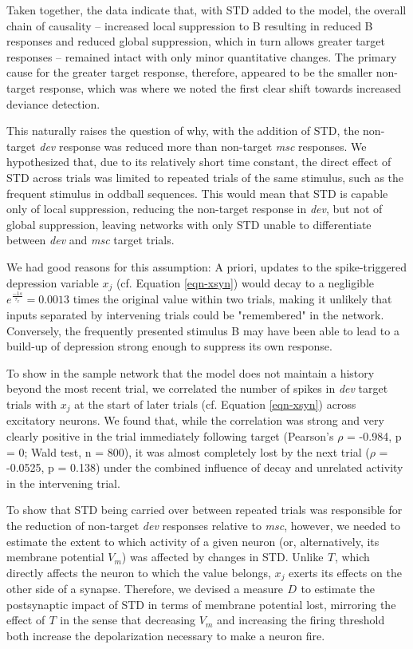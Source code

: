 \documentclass[pdflatex,referee,iicol,sn-basic]{sn-jnl}
\newcommand{\dev}{\textit{dev}}
\newcommand{\msc}{\textit{msc}}
\renewcommand{\T}[3][]{{}^{#1}_{}T^{#2}_{#3}}
\newcommand{\D}[3][]{{}^{#1}_{}\!D^{#2}_{#3}}
\theoremstyle{thmstyleone}%
\theoremstyle{thmstyletwo}%
\theoremstyle{thmstylethree}%
\begin{document}
Taken together, the data indicate that, with STD added to the model, the overall chain of causality -- increased local suppression to B resulting in reduced B responses and reduced global suppression, which in turn allows greater target responses -- remained intact with only minor quantitative changes. The primary cause for the greater target response, therefore, appeared to be the smaller non-target response, which was where we noted the first clear shift towards increased deviance detection.

This naturally raises the question of why, with the addition of STD, the non-target \dev{} response was reduced more than non-target \msc{} responses. We hypothesized that, due to its relatively short time constant, the direct effect of STD across trials was limited to repeated trials of the same stimulus, such as the frequent stimulus in oddball sequences. This would mean that STD is capable only of local suppression, reducing the non-target response in \dev{}, but not of global suppression, leaving networks with only STD unable to differentiate between \dev{} and \msc{} target trials.

We had good reasons for this assumption: A priori, updates to the spike-triggered depression variable $x_j$ (cf. Equation \ref{eqn-xsyn}) would decay to a negligible $e^\frac{-1 s}{\tau_x} = 0.0013$ times the original value within two trials, making it unlikely that inputs separated by intervening trials could be "remembered" in the network. Conversely, the frequently presented stimulus B may have been able to lead to a build-up of depression strong enough to suppress its own response.

To show in the sample network that the model does not maintain a history beyond the most recent trial, we correlated the number of spikes in \dev{} target trials with $x_j$ at the start of later trials (cf. Equation \ref{eqn-xsyn}) across excitatory neurons. We found that, while the correlation was strong and very clearly positive in the trial immediately following target (Pearson's $\rho$ = -0.984, p = 0; Wald test, n = 800), it was almost completely lost by the next trial ($\rho$ = -0.0525, p = 0.138) under the combined influence of decay and unrelated activity in the intervening trial.

To show that STD being carried over between repeated trials was responsible for the reduction of non-target \dev{} responses relative to \msc{}, however, we needed to estimate the extent to which activity of a given neuron (or, alternatively, its membrane potential $V_m$) was affected by changes in STD. Unlike $\T{}{}$, which directly affects the neuron to which the value belongs, $x_j$ exerts its effects on the other side of a synapse. Therefore, we devised a measure $\D{}{}$ to estimate the postsynaptic impact of STD in terms of membrane potential lost, mirroring the effect of $\T{}{}$ in the sense that decreasing $V_m$ and increasing the firing threshold both increase the depolarization necessary to make a neuron fire.
\end{document}
